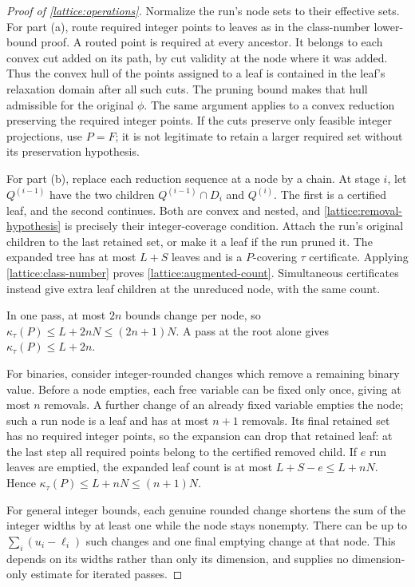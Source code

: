 \begin{proof}[Proof of \cref{lattice:operations}]
Normalize the run's node sets to their effective sets. For part (a), route
required integer points to leaves as in the class-number lower-bound
proof. A routed point is required at every ancestor. It belongs to each
convex cut added on its path, by cut validity at the node where it was
added. Thus the convex hull of the points assigned to a leaf is contained
in the leaf's relaxation domain after all such cuts. The pruning bound
makes that hull admissible for the original $\phi$. The same argument
applies to a convex reduction preserving the required integer points. If
the cuts preserve only feasible integer projections, use $P=F$; it is not
legitimate to retain a larger required set without its preservation
hypothesis.

For part (b), replace each reduction sequence at a node by a chain. At
stage $i$, let $Q^{(i-1)}$ have the two children
$Q^{(i-1)}\cap D_i$ and $Q^{(i)}$. The first is a certified leaf, and the
second continues. Both are convex and nested, and
\eqref{lattice:removal-hypothesis} is precisely their integer-coverage
condition. Attach the run's original children to the last retained set,
or make it a leaf if the run pruned it. The expanded tree has at most
$L+S$ leaves and is a $P$-covering $\tau$ certificate. Applying
\cref{lattice:class-number} proves \eqref{lattice:augmented-count}.
Simultaneous certificates instead give extra leaf children at the
unreduced node, with the same count.

In one pass, at most $2n$ bounds change per node, so
$\kappa_\tau(P)\le L+2nN\le(2n+1)N$. A pass at the root alone gives
$\kappa_\tau(P)\le L+2n$.

For binaries, consider integer-rounded changes which remove a remaining
binary value. Before a node empties, each free variable can be fixed only
once, giving at most $n$ removals. A further change of an already fixed
variable empties the node; such a run node is a leaf and has at most
$n+1$ removals. Its final retained set has no required integer points, so
the expansion can drop that retained leaf: at the last step all required
points belong to the certified removed child. If $e$ run leaves are
emptied, the expanded leaf count is at most
$L+S-e\le L+nN$. Hence
$\kappa_\tau(P)\le L+nN\le(n+1)N$.

For general integer bounds, each genuine rounded change shortens the sum
of the integer widths by at least one while the node stays nonempty.
There can be up to $\sum_i(u_i-\ell_i)$ such changes and one final
emptying change at that node. This depends on its widths rather than only
its dimension, and supplies no dimension-only estimate for iterated
passes.
\end{proof}

